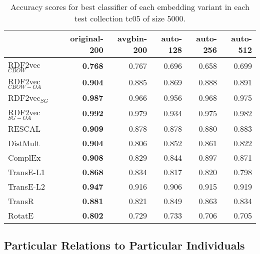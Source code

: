 \documentclass[11pt,titlepage,oneside,openany]{book}
\begin{document}
\begin{table}[h!]
\centering
\begin{tabular}{lrrrrr}
\toprule
{} &  original-200 &  avgbin-200 &  auto-128 &  auto-256 &  auto-512 \\
\midrule
RDF2vec$_{CBOW}$     &	\textbf{0.768} &       0.767  &     0.696  &     0.658  &     0.699  \\
RDF2vec$_{CBOW-OA}$  &	\textbf{0.904} &       0.885  &     0.869  &     0.888  &     0.891  \\
RDF2vec$_{SG}$       &	\textbf{0.987} &       0.966  &     0.956  &     0.968  &     0.975  \\
RDF2vec$_{SG-OA}$    &	\textbf{0.992} &       0.979  &     0.934  &     0.975  &     0.982  \\
RESCAL               &	\textbf{0.909} &       0.878  &     0.878  &     0.880  &     0.883  \\
DistMult             &	\textbf{0.904} &       0.806  &     0.852  &     0.861  &     0.822  \\
ComplEx              &	\textbf{0.908} &       0.829  &     0.844  &     0.897  &     0.871  \\
TransE-L1            &	\textbf{0.868} &       0.834  &     0.817  &     0.820  &     0.798  \\
TransE-L2            &	\textbf{0.947} &       0.916  &     0.906  &     0.915  &     0.919  \\
TransR               &	\textbf{0.881} &       0.821  &     0.849  &     0.863  &     0.834  \\
RotatE               &	\textbf{0.802} &       0.729  &     0.733  &     0.706  &     0.705  \\
\bottomrule
\end{tabular}
\caption{Accuracy scores for best classifier of each embedding variant in each test collection tc05 of size 5000.}
\label{tab:dlcc-acc-tc05-5000}
\end{table}

\newpage

\subsection{Particular Relations to Particular Individuals}
\label{subsec:dlcc-results-tc06}
\end{document}
